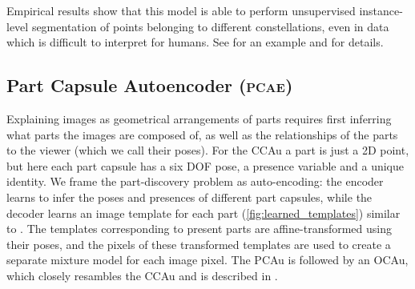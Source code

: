 Empirical results show that this model is able to perform unsupervised instance-level segmentation of points belonging to different constellations, even in data which is difficult to interpret for humans. See  for an example and  for details.

\subsection{Part Capsule Autoencoder (\textsc{pcae})}
\label{sec:img_capsule}
Explaining images as geometrical arrangements of parts requires first inferring what parts the images are composed of, as well as the relationships of the parts to the viewer (which we call their poses). For the \gls{CCAu} a part is just a 2D point, but here each part capsule has a six \gls{DOF} pose, a presence variable and a unique identity. We frame the part-discovery problem as auto-encoding: the encoder learns to infer the poses and presences of different part capsules, while the decoder learns an image template for each part (\cref{fig:learned_templates}) similar to \cite{Tieleman2014thesis,Eslami2016}. The templates corresponding to present parts are affine-transformed using their poses, and the pixels of these transformed templates are used to create a separate mixture model for each image pixel.
The \gls{PCAu} is followed by an \gls{OCAu}, which closely resambles the \gls{CCAu} and is described in .

